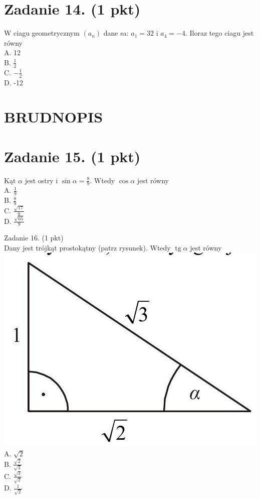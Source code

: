 \documentclass[10pt]{article}
\begin{document}
\section*{Zadanie 14. (1 pkt)}
W ciagu geometrycznym \(\left(a_{n}\right)\) dane sa: \(a_{1}=32\) i \(a_{4}=-4\). Iloraz tego ciagu jest równy\\
A. 12\\
B. \(\frac{1}{2}\)\\
C. \(-\frac{1}{2}\)\\
D. -12

\section*{BRUDNOPIS}
\section*{Zadanie 15. (1 pkt)}
Kąt \(\alpha\) jest ostry i \(\sin \alpha=\frac{8}{9}\). Wtedy \(\cos \alpha\) jest równy\\
A. \(\frac{1}{9}\)\\
B. \(\frac{8}{9}\)\\
C. \(\frac{\sqrt{17}}{9}\)\\
D. \(\frac{\sqrt{65}}{9}\)

Zadanie 16. (1 pkt)\\
Dany jest trójkąt prostokątny (patrz rysunek). Wtedy \(\operatorname{tg} \alpha\) jest równy\\
\includegraphics[max width=\textwidth, center]{2024_11_21_ad52a81220b9b2239458g-06}\\
A. \(\sqrt{2}\)\\
B. \(\frac{\sqrt{2}}{\sqrt{3}}\)\\
C. \(\frac{\sqrt{3}}{\sqrt{2}}\)\\
D. \(\frac{1}{\sqrt{2}}\)
\end{document}
